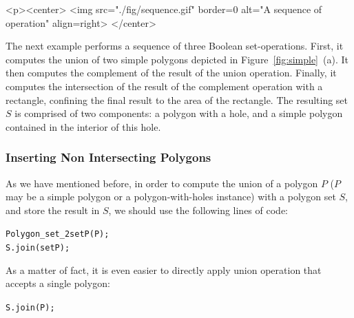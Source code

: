 \lcTex{%
  \setlength{\widthRight}{2.3cm}
  \setlength{\widthLeft}{\widthLineReal}
  \addtolength{\widthLeft}{-\widthRight}
  \begin{minipage}{\widthLeft}
}
\label{fig:sequence}
\begin{ccHtmlOnly}
  <p><center>
    <img src="./fig/sequence.gif" border=0 alt="A sequence of operation" align=right>
  </center>
\end{ccHtmlOnly}
The next example performs a sequence of three Boolean set-operations.
First, it computes the union of two simple polygons depicted in
Figure~\ref{fig:simple}~(a). It then computes the complement of the result
of the union operation. Finally, it computes the intersection of the result
of the complement operation with a rectangle, confining the final result to 
the area of the rectangle. The resulting set $S$ is comprised of two
components: a polygon with a hole, and a simple polygon contained in the
interior of this hole.


\subsubsection{Inserting Non Intersecting Polygons}
\label{bops_ssec:insert_ni}

As we have mentioned before, in order to compute the union of a polygon $P$
($P$ may be a simple polygon or a polygon-with-holes instance)
with a polygon set $S$, and store the result in $S$, we should use the
following lines of code:
\begin{alltt}
  Polygon_set_2  setP (P);
  S.join (setP);
\end{alltt}
As a matter of fact, it is even easier to directly apply union operation
that accepts a single polygon:
\begin{alltt}
  S.join (P);
\end{alltt}

